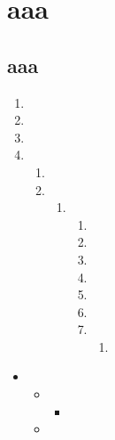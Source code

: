 \documentclass{ctexart}
\begin{document}
\chapter{aaa}
\section{aaa}
\begin{enumerate}
	\item
	\item
	\item
	\item
	      \begin{enumerate}
		      \item
		      \item
		            \begin{enumerate}
			            \item
			                  \begin{enumerate}
				                  \item
				                  \item
				                  \item
				                  \item
				                  \item
				                  \item
				                  \item
				                        \begin{enumerate}
					                        \item
				                        \end{enumerate}

			                  \end{enumerate}
		            \end{enumerate}
	      \end{enumerate}
\end{enumerate}
\begin{itemize}
	\begin{itemize}
		\item
		      \begin{itemize}
			      \item
			            \begin{itemize}
				            \item
			            \end{itemize}
			      \item
		      \end{itemize}
	\end{itemize}
\end{itemize}
\end{document}
